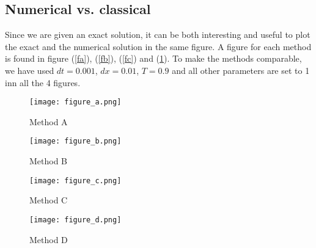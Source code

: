 \documentclass[norsk,a4paper,12pt]{article}
\begin{document}
\subsection{Numerical vs. classical}
Since we are given an exact solution, it can be both interesting and useful to plot the exact and the numerical solution in the same figure. A figure for each method is found in figure (\ref{fa}), (\ref{fb}), (\ref{fc}) and (\ref{fd}). To make the methods comparable, we have used $dt=0.001$, $dx=0.01$, $T=0.9$ and all other parameters are set to 1 inn all the 4 figures.
\begin{figure}[ht] 
  \label{numvsclas} 
  \begin{minipage}[b]{0.6\linewidth}
    \texttt{[image: figure\_a.png]} 
    \caption{Method A\label{fa}} 
    \vspace{4ex}
  \end{minipage}%
  \begin{minipage}[b]{0.6\linewidth}
    \texttt{[image: figure\_b.png]} 
    \caption{Method B\label{fb}} 
    \vspace{4ex}
  \end{minipage} 
  \begin{minipage}[b]{0.6\linewidth}
    \texttt{[image: figure\_c.png]} 
    \caption{Method C\label{fc}} 
    \vspace{4ex}
  \end{minipage}%
  \begin{minipage}[b]{0.6\linewidth}
    \texttt{[image: figure\_d.png]} 
    \caption{Method D\label{fd}} 
    \vspace{4ex}
  \end{minipage} 
\end{figure}
\end{document}
